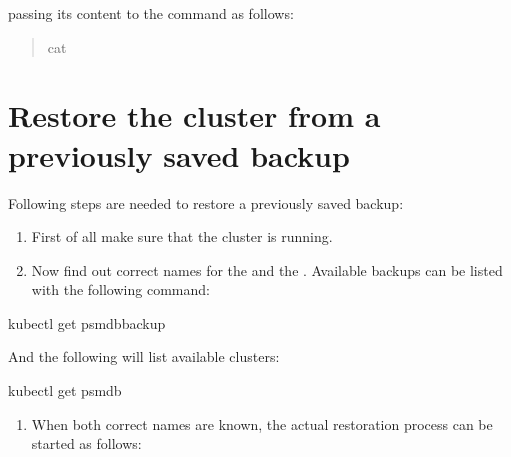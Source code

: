 \documentclass[letterpaper,10pt,english]{sphinxmanual}
\begin{document}
passing its content to the  command as follows:
\begin{quote}

\begin{sphinxVerbatim}[commandchars=\\\{\}]
cat 
\end{sphinxVerbatim}
\end{quote}


\section{Restore the cluster from a previously saved backup}
\label{\detokenize{backups:restore-the-cluster-from-a-previously-saved-backup}}
Following steps are needed to restore a previously saved backup:
\begin{enumerate}
%
\item {} 
First of all make sure that the cluster is running.

\item {} 
Now find out correct names for the  and the . Available
backups can be listed with the following command:

\end{enumerate}

\begin{sphinxVerbatim}[commandchars=\\\{\}]
   kubectl get psmdb\PYGZhy{}backup

And the following  will list available clusters:
\end{sphinxVerbatim}

\begin{sphinxVerbatim}[commandchars=\\\{\}]
kubectl get psmdb
\end{sphinxVerbatim}
\begin{enumerate}
%
\setcounter{enumi}{2}
\item {} 
When both correct names are known, the actual restoration process can
be started as follows:

\end{enumerate}
\end{document}
